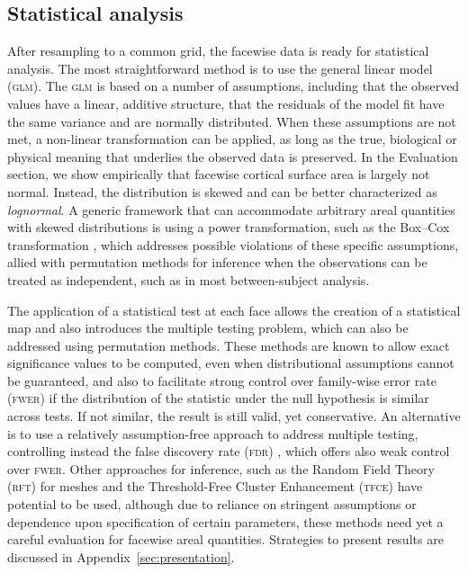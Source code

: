 \subsection{Statistical analysis}

After resampling to a common grid, the facewise data is ready for statistical analysis. The most straightforward method is to use the general linear model (\textsc{glm}). The \textsc{glm} is based on a number of assumptions, including that the observed values have a linear, additive structure, that the residuals of the model fit have the same variance and are normally distributed. When these assumptions are not met, a non-linear transformation can be applied, as long as the true, biological or physical meaning that underlies the observed data is preserved. In the Evaluation section, we show empirically that facewise cortical surface area is largely not normal. Instead, the distribution is skewed and can be better characterized as \emph{lognormal}. A generic framework that can accommodate arbitrary areal quantities with skewed distributions is using a power transformation, such as the Box--Cox transformation \citep{Box1964}, which addresses possible violations of these specific assumptions, allied with permutation methods for inference \citep{Holmes1996, Nichols2003} when the observations can be treated as independent, such as in most between-subject analysis.

The application of a statistical test at each face allows the creation of a statistical map and also introduces the multiple testing problem, which can also be addressed using permutation methods. These methods are known to allow exact significance values to be computed, even when distributional assumptions cannot be guaranteed, and also to facilitate strong control over family-wise error rate (\textsc{fwer}) if the distribution of the statistic under the null hypothesis is similar across tests. If not similar, the result is still valid, yet conservative. An alternative is to use a relatively assumption-free approach to address multiple testing, controlling instead the false discovery rate (\textsc{fdr}) \citep{Benjamini1995, Genovese2002}, which offers also weak control over \textsc{fwer}. Other approaches for inference, such as the Random Field Theory (\textsc{rft}) for meshes \citep{Worsley1999, Hagler2006} and the Threshold-Free Cluster Enhancement (\textsc{tfce}) \citep{Smith2009} have potential to be used, although due to reliance on stringent assumptions or dependence upon specification of certain parameters, these methods need yet a careful evaluation for facewise areal quantities. Strategies to present results are discussed in Appendix~\ref{sec:presentation}.

